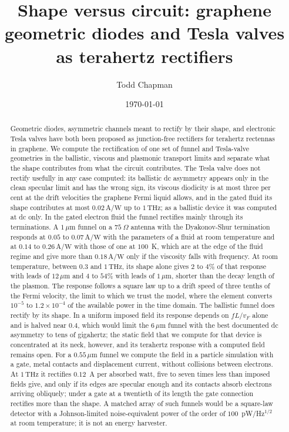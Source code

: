 \documentclass[aps,prapplied,twocolumn,superscriptaddress,floatfix,longbibliography]{revtex4-2}
\newcommand{\vF}{v_{F}}
\newcommand{\um}{\,\mu\mathrm{m}}
\newcommand{\THz}{\,\mathrm{THz}}
\newcommand{\AW}{\,\mathrm{A/W}}
\begin{document}
\title{Shape versus circuit: graphene geometric diodes and Tesla valves as terahertz rectifiers}

\author{Todd Chapman}

\date{\today}

\begin{abstract}
Geometric diodes, asymmetric channels meant to rectify by their shape, and
electronic Tesla valves have both been proposed as junction-free rectifiers
for terahertz rectennas in graphene. We compute the rectification of one
set of funnel and Tesla-valve geometries in the ballistic, viscous and
plasmonic transport limits and separate what the shape contributes from
what the circuit contributes. The Tesla valve does not rectify usefully
in any case computed: its ballistic dc asymmetry appears only in the clean
specular limit and has the wrong sign, its viscous diodicity is at most
three per cent at the drift velocities the graphene Fermi liquid allows,
and in the gated fluid its shape contributes at most $0.02\AW$ up to
$1\THz$; as a ballistic device it was computed at dc only. In the gated
electron fluid the funnel rectifies mainly through its terminations. A
$1\um$ funnel on a $75\ \Omega$ antenna with the Dyakonov-Shur termination
responds at $0.05$ to $0.07\AW$ with the parameters of a fluid at room
temperature and at $0.14$ to $0.26\AW$ with those of one at $100$~K, which
are at the edge of the fluid regime and give more than $0.18\AW$ only if
the viscosity falls with frequency. At room temperature, between $0.3$ and
$1\THz$, its shape alone gives $2$ to $4\%$ of that response with leads of
$12\um$ and $4$ to $54\%$ with leads of $1\um$, shorter than the decay
length of the plasmon. The response follows a square law up to a drift
speed of three tenths of the Fermi velocity, the limit to which we trust
the model, where the element converts $10^{-5}$ to $1.2\times10^{-4}$ of
the available power in the time domain. The ballistic funnel does rectify
by its shape. In a uniform imposed field its response depends on $fL/\vF$
alone and is halved near $0.4$, which would limit the $6\um$ funnel with
the best documented dc asymmetry to tens of gigahertz; the static field
that we compute for that device is concentrated at its neck, however, and
its terahertz response with a computed field remains open. For a $0.55\um$
funnel we compute the field in a particle simulation with a gate, metal
contacts and displacement current, without collisions between electrons.
At $1\THz$ it rectifies $0.12$~A per absorbed watt, five to seven times
less than imposed fields give, and only if its edges are specular enough
and its contacts absorb electrons arriving obliquely; under a gate at a
twentieth of its length the gate connection rectifies more than the
shape. A matched array of such funnels would be a square-law detector
with a Johnson-limited noise-equivalent power of the order of
$100$~pW/Hz$^{1/2}$ at room temperature; it is not an energy harvester.
\end{abstract}
\end{document}
